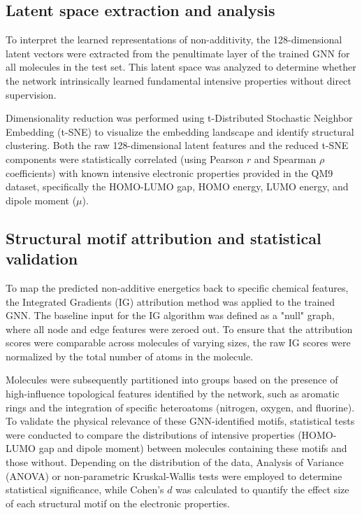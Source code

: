 \documentclass[]{article}
\begin{document}
\subsection{Latent space extraction and analysis}
To interpret the learned representations of non-additivity, the 128-dimensional latent vectors were extracted from the penultimate layer of the trained GNN for all molecules in the test set. This latent space was analyzed to determine whether the network intrinsically learned fundamental intensive properties without direct supervision. 

Dimensionality reduction was performed using t-Distributed Stochastic Neighbor Embedding (t-SNE) to visualize the embedding landscape and identify structural clustering. Both the raw 128-dimensional latent features and the reduced t-SNE components were statistically correlated (using Pearson $r$ and Spearman $\rho$ coefficients) with known intensive electronic properties provided in the QM9 dataset, specifically the HOMO-LUMO gap, HOMO energy, LUMO energy, and dipole moment ($\mu$).

\subsection{Structural motif attribution and statistical validation}
To map the predicted non-additive energetics back to specific chemical features, the Integrated Gradients (IG) attribution method was applied to the trained GNN. The baseline input for the IG algorithm was defined as a "null" graph, where all node and edge features were zeroed out. To ensure that the attribution scores were comparable across molecules of varying sizes, the raw IG scores were normalized by the total number of atoms in the molecule.

Molecules were subsequently partitioned into groups based on the presence of high-influence topological features identified by the network, such as aromatic rings and the integration of specific heteroatoms (nitrogen, oxygen, and fluorine). To validate the physical relevance of these GNN-identified motifs, statistical tests were conducted to compare the distributions of intensive properties (HOMO-LUMO gap and dipole moment) between molecules containing these motifs and those without. Depending on the distribution of the data, Analysis of Variance (ANOVA) or non-parametric Kruskal-Wallis tests were employed to determine statistical significance, while Cohen's $d$ was calculated to quantify the effect size of each structural motif on the electronic properties.
\end{document}
